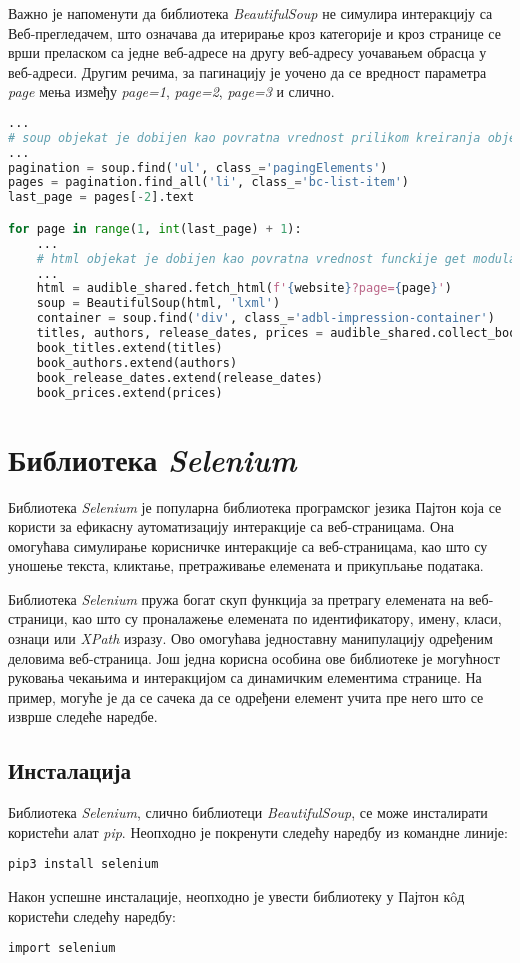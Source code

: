 \documentclass[12pt,oneside]{memoir}
\begin{document}
Важно је напоменути да библиотека \textit{BeautifulSoup} не симулира интеракцију са Веб-прегледачем, што означава да итерирање кроз категорије и кроз странице се врши преласком са једне веб-адресе на другу веб-адресу уочавањем обрасца у веб-адреси. Другим речима, за пагинацију је уочено да се вредност параметра \textit{page} мења између 
\textit{page=1}, \textit{page=2}, \textit{page=3} и слично.
\begin{lstlisting}[language=Python, caption={Прикупљање података са више веб-страница}, label={lst:beautiful-soap-scrape-mutliple}]
...
# soup objekat je dobijen kao povratna vrednost prilikom kreiranja objekta tipa BeautifulSoup
...
pagination = soup.find('ul', class_='pagingElements')
pages = pagination.find_all('li', class_='bc-list-item')
last_page = pages[-2].text

for page in range(1, int(last_page) + 1):
    ...
    # html objekat je dobijen kao povratna vrednost funckije get modula requests 
    ...
    html = audible_shared.fetch_html(f'{website}?page={page}')
    soup = BeautifulSoup(html, 'lxml')
    container = soup.find('div', class_='adbl-impression-container')
    titles, authors, release_dates, prices = audible_shared.collect_books_info(container)
    book_titles.extend(titles)
    book_authors.extend(authors)
    book_release_dates.extend(release_dates)
    book_prices.extend(prices)
\end{lstlisting}

\section{Библиотека \textit{Selenium}}
\label{chp:selenium}
Библиотека \textit{Selenium} је популарна библиотека програмског језика Пајтон која се користи за ефикасну аутоматизацију интеракције са веб-страницама. Она омогућава симулирање корисничке интеракције са веб-страницама, као што су уношење текста, кликтање, претраживање елемената и прикупљање података. 

Библиотека \textit{Selenium} пружа богат скуп функција за претрагу елемената на веб-страници, као што су проналажење елемената по идентификатору, имену, класи, ознаци или \textit{XPath} изразу. Ово омогућава једноставну манипулацију одређеним деловима веб-страница. Још једна корисна особина ове библиотеке је могућност руковања чекањима и интеракцијом са динамичким елементима странице. На пример, могуће је да се сачека да се одређени елемент учита пре него што се изврше следеће наредбе.

\subsection{Инсталација}
Библиотека \textit{Selenium}, слично библиотеци \textit{BeautifulSoup}, се може инсталирати користећи алат \textit{pip}. Неопходно је покренути следећу наредбу из командне линије:
\begin{verbatim}
pip3 install selenium
\end{verbatim}
Након успешне инсталације, неопходно је увести библиотеку у Пајтон кôд користећи следећу наредбу:
\begin{verbatim}
import selenium
\end{verbatim}
\end{document}
